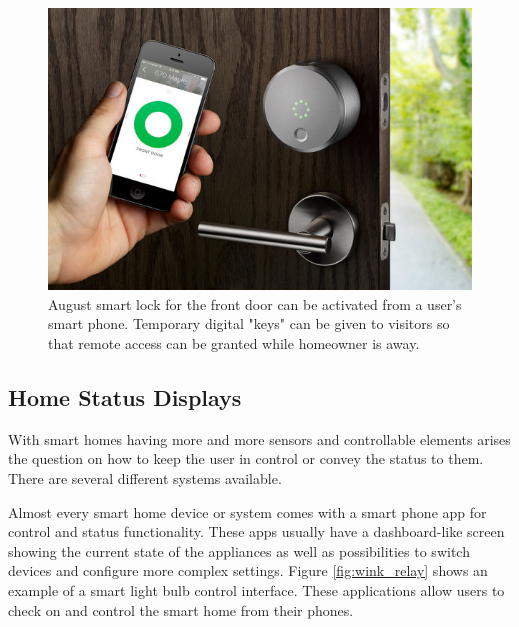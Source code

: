 \begin{figure}[ht]
\centering
	\includegraphics[keepaspectratio, width=6in]{Figures/Benchmarking/august.jpg}
	\caption{August smart lock for the front door can be activated from a user's smart phone. Temporary digital "keys" can be given to visitors so that remote access can be granted while homeowner is away. \protect\footnotemark}
	\label{fig:august.jpg}
\end{figure}

\subsection{Home Status Displays} 
With smart homes having more and more sensors and controllable elements arises the question on how to keep the user in control or convey the status to them. There are several different systems available.

Almost every smart home device or system comes with a smart phone app for control and status functionality. These apps usually have a dashboard-like screen showing the current state of the appliances as well as possibilities to switch devices and configure more complex settings. Figure \ref{fig:wink_relay} shows an example of a smart light bulb control interface. These applications allow users to check on and control the smart home from their phones.

